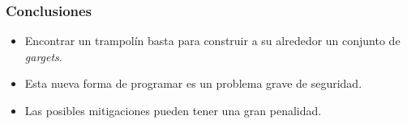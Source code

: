\documentclass{beamer}
\begin{document}
\begin{frame}
    \frametitle{Conclusiones}
    \begin{itemize}
        \item Encontrar un trampolín basta para construir a su alrededor un conjunto de \textit{gargets}.
        \item Esta nueva forma de programar es un problema grave de seguridad.
        \item Las posibles mitigaciones pueden tener una gran penalidad.
    \end{itemize}
\end{frame}
\end{document}

